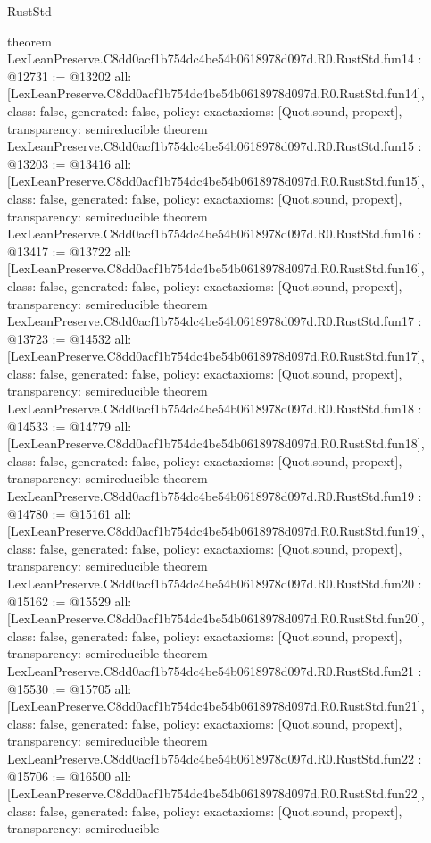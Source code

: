 \begin{lexlean}{RustStd}
\begin{coremodule}
{}
theorem LexLeanPreserve.C8dd0acf1b754dc4be54b0618978d097d.R0.RustStd.fun14 : @12731 := @13202 {
  all: [LexLeanPreserve.C8dd0acf1b754dc4be54b0618978d097d.R0.RustStd.fun14],
  class: false,
  generated: false,
  policy: exact{axioms: [Quot.sound, propext]},
  transparency: semireducible
}
theorem LexLeanPreserve.C8dd0acf1b754dc4be54b0618978d097d.R0.RustStd.fun15 : @13203 := @13416 {
  all: [LexLeanPreserve.C8dd0acf1b754dc4be54b0618978d097d.R0.RustStd.fun15],
  class: false,
  generated: false,
  policy: exact{axioms: [Quot.sound, propext]},
  transparency: semireducible
}
theorem LexLeanPreserve.C8dd0acf1b754dc4be54b0618978d097d.R0.RustStd.fun16 : @13417 := @13722 {
  all: [LexLeanPreserve.C8dd0acf1b754dc4be54b0618978d097d.R0.RustStd.fun16],
  class: false,
  generated: false,
  policy: exact{axioms: [Quot.sound, propext]},
  transparency: semireducible
}
theorem LexLeanPreserve.C8dd0acf1b754dc4be54b0618978d097d.R0.RustStd.fun17 : @13723 := @14532 {
  all: [LexLeanPreserve.C8dd0acf1b754dc4be54b0618978d097d.R0.RustStd.fun17],
  class: false,
  generated: false,
  policy: exact{axioms: [Quot.sound, propext]},
  transparency: semireducible
}
theorem LexLeanPreserve.C8dd0acf1b754dc4be54b0618978d097d.R0.RustStd.fun18 : @14533 := @14779 {
  all: [LexLeanPreserve.C8dd0acf1b754dc4be54b0618978d097d.R0.RustStd.fun18],
  class: false,
  generated: false,
  policy: exact{axioms: [Quot.sound, propext]},
  transparency: semireducible
}
theorem LexLeanPreserve.C8dd0acf1b754dc4be54b0618978d097d.R0.RustStd.fun19 : @14780 := @15161 {
  all: [LexLeanPreserve.C8dd0acf1b754dc4be54b0618978d097d.R0.RustStd.fun19],
  class: false,
  generated: false,
  policy: exact{axioms: [Quot.sound, propext]},
  transparency: semireducible
}
theorem LexLeanPreserve.C8dd0acf1b754dc4be54b0618978d097d.R0.RustStd.fun20 : @15162 := @15529 {
  all: [LexLeanPreserve.C8dd0acf1b754dc4be54b0618978d097d.R0.RustStd.fun20],
  class: false,
  generated: false,
  policy: exact{axioms: [Quot.sound, propext]},
  transparency: semireducible
}
theorem LexLeanPreserve.C8dd0acf1b754dc4be54b0618978d097d.R0.RustStd.fun21 : @15530 := @15705 {
  all: [LexLeanPreserve.C8dd0acf1b754dc4be54b0618978d097d.R0.RustStd.fun21],
  class: false,
  generated: false,
  policy: exact{axioms: [Quot.sound, propext]},
  transparency: semireducible
}
theorem LexLeanPreserve.C8dd0acf1b754dc4be54b0618978d097d.R0.RustStd.fun22 : @15706 := @16500 {
  all: [LexLeanPreserve.C8dd0acf1b754dc4be54b0618978d097d.R0.RustStd.fun22],
  class: false,
  generated: false,
  policy: exact{axioms: [Quot.sound, propext]},
  transparency: semireducible
}
\end{coremodule}
\end{lexlean}
